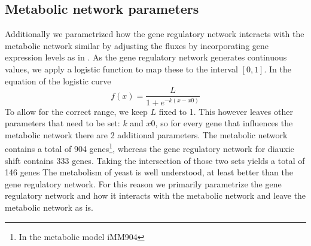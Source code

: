 \subsection{Metabolic network parameters}
Additionally we parametrized how the gene regulatory network interacts with the metabolic network similar by adjusting the fluxes 
by incorporating gene expression levels as in \cite{chandrasekaran2010probabilistic}.
As the gene regulatory network generates continuous values, we apply
a logistic function to map these to the interval $[0,1]$. 
In the equation of the logistic curve 
\begin{equation}
 f(x) = \frac{L}{1+e^{-k(x-x0)}}
\end{equation}
To allow for the correct range, we keep $L$ fixed to 1. This however leaves other parameters that need to be set: $k$ and $x0$, so for every gene that influences the metabolic
network there are 2 additional parameters. The metabolic network contains a total of 904 genes\footnote{In the metabolic model iMM904}, whereas the gene regulatory
network for diauxic shift contains 333 genes. Taking the intersection of those two sets yields a total of 146 genes
The metabolism of yeast is well understood, at least better than the gene regulatory network\cite{NEEDED}. For this reason we primarily parametrize the gene regulatory network and how it interacts with the metabolic network
and leave the metabolic network as is.
